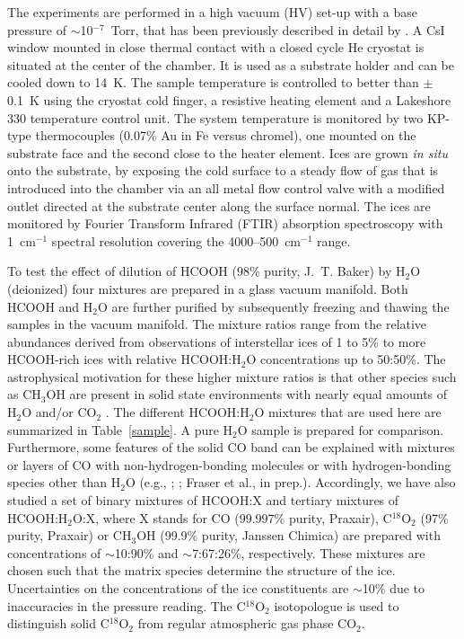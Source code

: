 \documentclass{aa}
\begin{document}
The experiments are performed in a high vacuum (HV) set-up with a base
pressure of $\sim$10$^{-7}$~Torr, that has been previously described
in detail by \citet{gerakines1995}. A CsI window mounted in close
thermal contact with a closed cycle He cryostat is situated at the
center of the chamber. It is used as a substrate holder and can be
cooled down to 14~K. The sample temperature is controlled to better
than $\pm$0.1~K using the cryostat cold finger, a resistive heating
element and a Lakeshore 330 temperature control unit. The system
temperature is monitored by two KP-type thermocouples (0.07\% Au in Fe
versus chromel), one mounted on the substrate face and the second
close to the heater element. Ices are grown {\it in situ} onto the
substrate, by exposing the cold surface to a steady flow of gas that
is introduced into the chamber via an all metal flow control valve
with a modified outlet directed at the substrate center along the
surface normal. The ices are monitored by Fourier Transform Infrared
(FTIR) absorption spectroscopy with 1~cm$^{-1}$ spectral resolution
covering the 4000--500~cm$^{-1}$ range.

To test the effect of dilution of HCOOH (98\% purity, J.~T. Baker) by
H$_2$O (deionized) four mixtures are prepared in a glass vacuum
manifold. Both HCOOH and H$_2$O are further purified by subsequently
freezing and thawing the samples in the vacuum manifold. The mixture
ratios range from the relative abundances derived from observations of
interstellar ices of 1 to 5\% \citep[see e.g.,][]{gibb2004} to more
HCOOH-rich ices with relative HCOOH:H$_2$O concentrations up to
50:50\%. The astrophysical motivation for these higher mixture ratios
is that other species such as CH$_3$OH are present in solid state
environments with nearly equal amounts of H$_2$O and/or CO$_2$
\citep{ehrenfreund1998,ehrenfreund1999,dartois1999}. The different
HCOOH:H$_2$O mixtures that are used here are summarized in
Table~\ref{sample}. A pure H$_2$O sample is prepared for
comparison. Furthermore, some features of the solid CO band can be
explained with mixtures or layers of CO with non-hydrogen-bonding
molecules or with hydrogen-bonding species other than H$_2$O (e.g.,
\citealp{tielens1991}; \citealp{pontoppidan2003}; Fraser et al., in
prep.). Accordingly, we have also studied a set of binary mixtures of
HCOOH:X and tertiary mixtures of HCOOH:H$_2$O:X, where X stands for CO
(99.997\% purity, Praxair), C$^{18}$O$_2$ (97\% purity, Praxair) or CH$_3$OH
(99.9\% purity, Janssen Chimica) are prepared with concentrations of
$\sim$10:90\% and $\sim$7:67:26\%, respectively. These mixtures are
chosen such that the matrix species determine the structure of the
ice. Uncertainties on the concentrations of the ice constituents are
$\sim$10\% due to inaccuracies in the pressure reading. The
C$^{18}$O$_2$ isotopologue is used to distinguish solid C$^{18}$O$_2$
from regular atmospheric gas phase CO$_2$.
\end{document}
